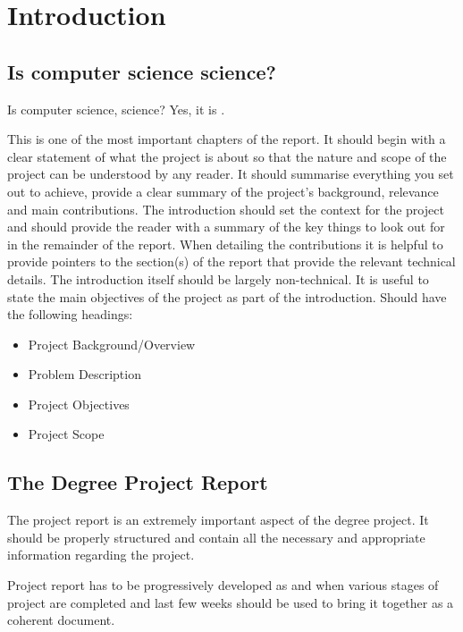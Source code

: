 \chapter{Introduction} \label{chap:intro}


\section*{}
\section{Is computer science science?}
Is computer science, science? Yes, it is \cite{ICSS05}.

This is one of the most important chapters of the report. It should begin with a clear statement of what the project is about so that the nature and scope of the project can be understood by any reader. It should summarise everything you set out to achieve, provide a clear summary of the project's background, relevance and main contributions. The introduction should set the context for the project and should provide the reader with a summary of the key things to look out for in the remainder of the report. When detailing the contributions it is helpful to provide pointers to the section(s) of the report that provide the relevant technical details. The introduction itself should be largely non-technical. It is useful to state the main objectives of the project as part of the introduction. Should have the following headings:

\begin{itemize}
	\item Project Background/Overview
	\item Problem Description
	\item 	Project Objectives 
	\item Project Scope
\end{itemize}

\section{The Degree Project Report}
The project report is an extremely important aspect of the degree project. It should be properly structured and contain all the necessary and appropriate information regarding the project.
 
Project report has to be progressively developed as and when various stages of project are completed and last few weeks should be used to bring it together as a coherent document.

